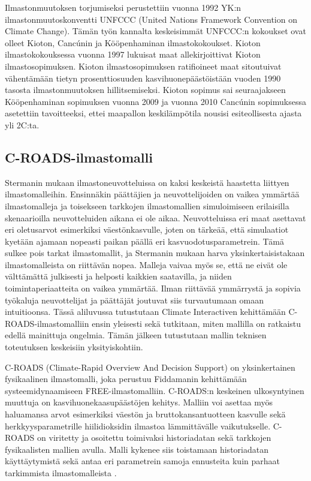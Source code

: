 \documentclass[finnish,12pt,a4paper,pdftex]{article}
\begin{document}
\begin{onehalfspacing}
Ilmastonmuutoksen torjumiseksi perustettiin vuonna 1992 YK:n ilmastonmuutoskonventti UNFCCC (United Nations Framework Convention on Climate Change). Tämän työn kannalta keskeisimmät UNFCCC:n kokoukset ovat olleet Kioton, Cancúnin ja Kööpenhaminan ilmastokokoukset. Kioton ilmastokokouksessa vuonna 1997 lukuisat maat allekirjoittivat Kioton ilmastosopimuksen. Kioton ilmastosopimuksen ratifioineet maat sitoutuivat vähentämään tietyn prosenttiosuuden kasvihuonepäästöistään vuoden 1990 tasosta ilmastonmuutoksen hillitsemiseksi. Kioton sopimus sai seuraajakseen Kööpenhaminan sopimuksen vuonna 2009 ja vuonna 2010 Cancúnin sopimuksessa asetettiin tavoitteeksi, ettei maapallon keskilämpötila nousisi esiteollisesta ajasta yli 2\degree C:ta. \cite{UNFCCC} 

\subsection{C-ROADS-ilmastomalli \label{ilmasto:croads}}

Stermanin \cite{CroadsFlightSimulator2011} mukaan ilmastoneuvotteluissa on kaksi keskeistä haastetta liittyen ilmastomalleihin. Ensinnäkin päättäjien ja neuvottelijoiden on vaikea ymmärtää ilmastomalleja ja toisekseen tarkkojen ilmastomallien simuloimiseen erilaisilla skenaarioilla neuvotteluiden aikana ei ole aikaa. Neuvotteluissa eri maat asettavat eri oletusarvot esimerkiksi väestönkasvulle, joten on tärkeää, että simulaatiot kyetään ajamaan nopeasti paikan päällä eri kasvuodotusparametrein. Tämä sulkee pois tarkat ilmastomallit, ja Stermanin \cite{CroadsFlightSimulator2011} mukaan harva yksinkertaisistakaan ilmastomalleista on riittävän nopea. Malleja vaivaa myös se, että ne eivät ole välttämättä julkisesti ja helposti kaikkien saatavilla, ja niiden toimintaperiaatteita on vaikea ymmärtää. Ilman riittävää ymmärrystä ja sopivia työkaluja neuvottelijat ja päättäjät joutuvat siis turvautumaan omaan intuitioonsa. Tässä aliluvussa tutustutaan Climate Interactiven kehittämään C-ROADS-ilmastomalliin ensin yleisesti sekä tutkitaan, miten mallilla on ratkaistu edellä mainittuja ongelmia. Tämän jälkeen tutustutaan mallin teknisen toteutuksen keskeisiin yksityiskohtiin. 

C-ROADS (Climate-Rapid Overview And Decision Support) on yksinkertainen fysikaalinen ilmastomalli, joka perustuu Fiddamanin \cite{Fiddaman1997} kehittämään systeemidynaamiseen FREE-ilmastomalliin. C-ROADS:n keskeinen ulkosyntyinen muuttuja on kasvihuonekaasupäästöjen kehitys. Malliin voi asettaa myös haluamansa arvot esimerkiksi väestön ja bruttokansantuotteen kasvulle sekä herkkyysparametrille hiilidioksidin ilmastoa lämmittävälle vaikutukselle. \cite{CroadsFlightSimulator2011, Croads} C-ROADS on viritetty ja osoitettu toimivaksi historiadatan sekä tarkkojen fysikaalisten mallien avulla. Malli kykenee siis toistamaan historiadatan käyttäytymistä sekä antaa eri parametrein samoja ennusteita kuin parhaat tarkimmista ilmastomalleista  \cite{CroadsWWW, CroadsFlightSimulator2011}.


\end{onehalfspacing}
\end{document}
